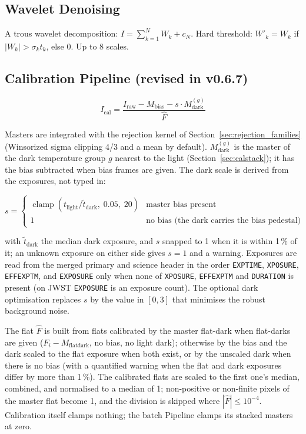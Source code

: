 \documentclass[11pt,a4paper]{article}
\newcommand{\code}[1]{\texttt{\small #1}}
\begin{document}
    \subsection{Wavelet Denoising}

    A trous wavelet decomposition: $I = \sum_{k=1}^{N} W_k + c_N$. Hard threshold: $W'_k = W_k$ if $|W_k| > \sigma_k t_k$, else 0. Up to 8 scales.

    \subsection{Calibration Pipeline (revised in v0.6.7)}
    \label{sec:calibration_math}

    \begin{equation}
        \boxed{
            I_{\text{cal}} = \frac{I_{\text{raw}} - M_{\text{bias}} - s \cdot M_{\text{dark}}^{(g)}}{\hat{F}}
        }
    \end{equation}

    Masters are integrated with the rejection kernel of Section~\ref{sec:rejection_families} (Winsorized sigma clipping 4/3 and a mean by default). $M_{\text{dark}}^{(g)}$ is the master of the dark temperature group $g$ nearest to the light (Section~\ref{sec:calstack}); it has the bias subtracted when bias frames are given. The dark scale is derived from the exposures, not typed in:

    \begin{equation}
        s = \begin{cases}
            \operatorname{clamp}\!\left(t_{\text{light}} / \tilde{t}_{\text{dark}},\; 0.05,\; 20\right) & \text{master bias present} \\[4pt]
            1 & \text{no bias (the dark carries the bias pedestal)}
        \end{cases}
    \end{equation}

    with $\tilde{t}_{\text{dark}}$ the median dark exposure, and $s$ snapped to 1 when it is within 1\,\% of it; an unknown exposure on either side gives $s = 1$ and a warning. Exposures are read from the merged primary and science header in the order \code{EXPTIME}, \code{XPOSURE}, \code{EFFEXPTM}, and \code{EXPOSURE} only when none of \code{XPOSURE}, \code{EFFEXPTM} and \code{DURATION} is present (on JWST \code{EXPOSURE} is an exposure count). The optional dark optimisation replaces $s$ by the value in $[0, 3]$ that minimises the robust background noise.

    The flat $\hat{F}$ is built from flats calibrated by the master flat-dark when flat-darks are given ($F_i - M_{\text{flatdark}}$, no bias, no light dark); otherwise by the bias and the dark scaled to the flat exposure when both exist, or by the unscaled dark when there is no bias (with a quantified warning when the flat and dark exposures differ by more than 1\,\%). The calibrated flats are scaled to the first one's median, combined, and normalised to a median of 1; non-positive or non-finite pixels of the master flat become 1, and the division is skipped where $|\hat{F}| \le 10^{-4}$. Calibration itself clamps nothing; the batch Pipeline clamps its stacked masters at zero.
\end{document}
